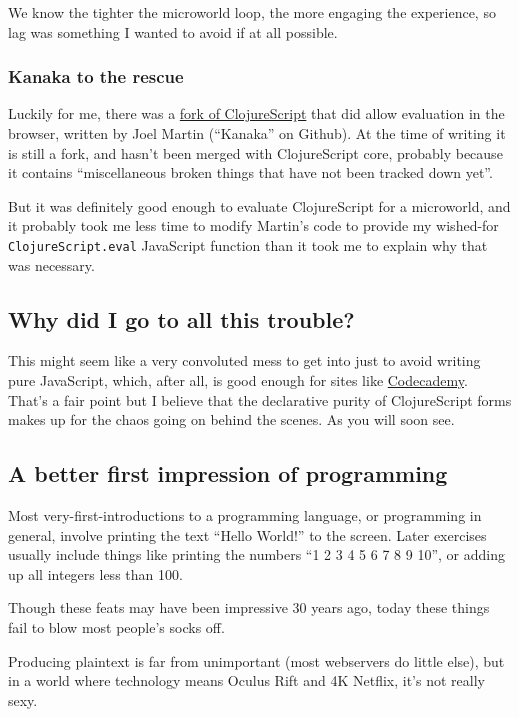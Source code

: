 We know the tighter the microworld loop, the more engaging the experience, so lag was something I wanted to avoid if at all possible.

\subsubsection{Kanaka to the rescue}

Luckily for me, there was a \href{https://github.com/kanaka/clojurescript}{fork of ClojureScript} that did allow evaluation in the browser, written by Joel Martin
(``Kanaka'' on Github). At the time of writing it is still a fork, and
hasn't been merged with ClojureScript core, probably because it contains
``miscellaneous broken things that have not been tracked down yet''.

But it was definitely good enough to evaluate ClojureScript for a
microworld, and it probably took me less time to modify Martin's code to
provide my wished-for \texttt{ClojureScript.eval} JavaScript function
than it took me to explain why that was necessary.

\subsection{Why did I go to all this trouble?}

This might seem like a very convoluted mess to get into just to avoid
writing pure JavaScript, which, after all, is good enough for sites like
\href{http://codecademy.com}{Codecademy}. That's a fair point but I believe that the declarative
purity of ClojureScript forms makes up for the chaos going on behind the
scenes. As you will soon see.

\subsection{A better first impression of programming}

Most very-first-introductions to a programming language, or programming
in general, involve printing the text ``Hello World!'' to the screen.
Later exercises usually include things like printing the numbers ``1 2 3
4 5 6 7 8 9 10'', or adding up all integers less than 100.

Though these feats may have been impressive 30 years ago, today these things fail to blow
most people's socks off.

Producing plaintext is far from unimportant (most webservers do little
else), but in a world where technology means Oculus Rift and 4K Netflix,
it's not really sexy.

